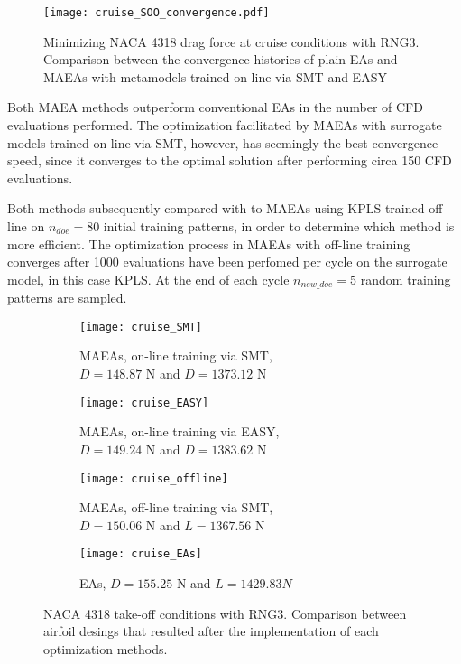 \begin{figure}[h!]
\centering
\texttt{[image: cruise\_SOO\_convergence.pdf]}   
\caption{Minimizing NACA 4318 drag force at cruise conditions 
with RNG3. Comparison between the convergence histories of plain 
EAs and MAEAs with metamodels trained on-line via SMT and EASY}
\label{fig:online_cruise} 
\end{figure}

\newpage


Both MAEA methods outperform conventional EAs in the number of CFD 
evaluations performed. The optimization facilitated by MAEAs with 
surrogate models trained on-line via SMT, however, has seemingly 
the best convergence speed, since it converges to the optimal 
solution after performing circa 150 CFD evaluations.
 
Both methods subsequently compared with to MAEAs using KPLS 
trained off-line on $n_{doe} \!= \!80$ initial training patterns, 
in order to determine which method is more efficient. The 
optimization process in MAEAs with off-line training converges 
after 1000 evaluations have been perfomed per cycle on the 
surrogate model, in this case KPLS. At the end of each cycle 
$n_{new\_doe} = 5$ random training patterns are sampled.

\begin{figure}[h!]
\centering
	\begin{subfigure}[b]{0.49\textwidth}
	\centering
	\caption{MAEAs, on-line training via SMT, 
	\\  $D \!= \!148.87$ N and $D \!= \!1373.12$ N}
	\texttt{[image: cruise\_SMT]} 
	\end{subfigure}
	\hfill
	\begin{subfigure}[b]{0.49\textwidth}
	\centering
	\caption{MAEAs, on-line training via EASY, 
	\\ $D \!= \!149.24$ N and $D \!= \!1383.62$ N}
	\texttt{[image: cruise\_EASY]}   
	\end{subfigure}
	\hfill
	\begin{subfigure}[b]{0.49\textwidth}
	\centering
	\caption{MAEAs, off-line training via SMT, 
	\\ $D \!= \!150.06$ N and $L \!= \!1367.56$ N}
	\texttt{[image: cruise\_offline]} 
	\end{subfigure}
	\hfill
	\begin{subfigure}[b]{0.49\textwidth}
	\centering
	\caption{EAs, $D \!= \!155.25$ N and $L \!= \!1429.83 N$}
	\texttt{[image: cruise\_EAs]}   
	\end{subfigure}
\caption{NACA 4318 take-off conditions with RNG3. Comparison 
between airfoil desings that resulted after the implementation of 
each optimization methods.} 
\label{fig:cruise_designs}
\end{figure}

